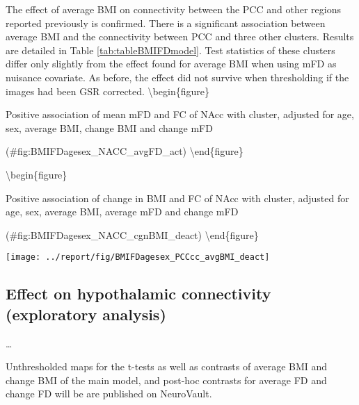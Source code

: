 \documentclass[
]{article}
\begin{document}
The effect of average BMI on connectivity between the PCC and other regions reported previously is confirmed. There is a significant association between average BMI and the connectivity between PCC and three other clusters. Results are detailed in Table \ref{tab:tableBMIFDmodel}.
Test statistics of these clusters differ only slightly from the effect found for average BMI when using mFD as nuisance covariate.
As before, the effect did not survive when thresholding if the images had been GSR corrected.
\textbackslash begin\{figure\}

\caption{Positive association of mean mFD and FC of NAcc with cluster, adjusted for age, sex, average BMI, change BMI and change mFD}

(\#fig:BMIFDagesex\_NACC\_avgFD\_act)
\textbackslash end\{figure\}

\textbackslash begin\{figure\}

\caption{Positive association of change in BMI and FC of NAcc with cluster, adjusted for age, sex, average BMI, average mFD and change mFD}

(\#fig:BMIFDagesex\_NACC\_cgnBMI\_deact)
\textbackslash end\{figure\}

\texttt{[image: ../report/fig/BMIFDagesex\_PCCcc\_avgBMI\_deact]}

\hypertarget{effect-on-hypothalamic-connectivity-exploratory-analysis}{%
\subsection{Effect on hypothalamic connectivity (exploratory analysis)}\label{effect-on-hypothalamic-connectivity-exploratory-analysis}}

\ldots{}

Unthresholded maps for the t-tests as well as contrasts of average BMI and change BMI of the main model, and post-hoc contrasts for average FD and change FD will be are published on NeuroVault.
\end{document}
